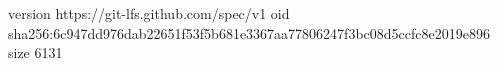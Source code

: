 version https://git-lfs.github.com/spec/v1
oid sha256:6c947dd976dab22651f53f5b681e3367aa77806247f3bc08d5ccfc8e2019e896
size 6131
